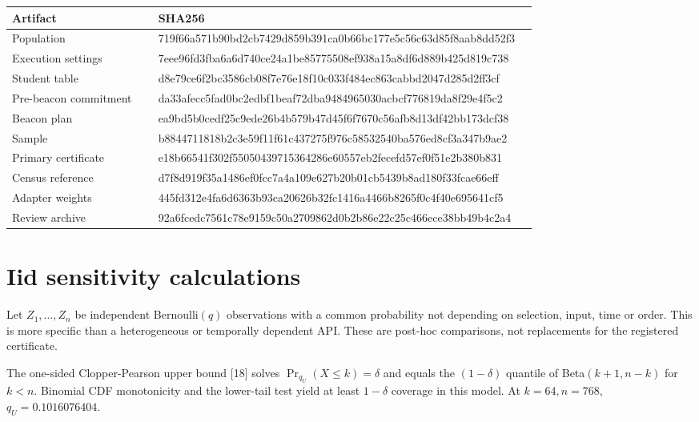 \documentclass[
  10pt,
]{article}
\let\oldsection\section
\renewcommand{\section}{\needspace{5\baselineskip}\oldsection}
\begin{document}
\begin{longtable}{@{}p{0.27\linewidth}p{0.70\linewidth}@{}}
\toprule
Artifact & SHA256 \\
\midrule
\endhead
Population & {\scriptsize\ttfamily 719f66a571b90bd2cb7429d859b391ca0b66bc177e5c56c63d85f8aab8dd52f3} \\
Execution settings & {\scriptsize\ttfamily 7eee96fd3fba6a6d740ce24a1be85775508ef938a15a8df6d889b425d819c738} \\
Student table & {\scriptsize\ttfamily d8e79ce6f2bc3586cb08f7e76e18f10c033f484ec863cabbd2047d285d2ff3cf} \\
Pre-beacon commitment & {\scriptsize\ttfamily da33afecc5fad0bc2edbf1beaf72dba9484965030acbcf776819da8f29e4f5c2} \\
Beacon plan & {\scriptsize\ttfamily ea9bd5b0cedf25c9ede26b4b579b47d45f6f7670c56afb8d13df42bb173dcf38} \\
Sample & {\scriptsize\ttfamily b8844711818b2c3e59f11f61c437275f976c58532540ba576ed8cf3a347b9ae2} \\
Primary certificate & {\scriptsize\ttfamily e18b66541f302f55050439715364286e60557eb2fecefd57ef0f51e2b380b831} \\
Census reference & {\scriptsize\ttfamily d7f8d919f35a1486ef0fcc7a4a109e627b20b01cb5439b8ad180f33fcae66eff} \\
Adapter weights & {\scriptsize\ttfamily 445fd312e4fa6d6363b93ca20626b32fc1416a4466b8265f0c4f40e695641cf5} \\
Review archive & {\scriptsize\ttfamily 92a6fcedc7561c78e9159c50a2709862d0b2b86e22c25c466ece38bb49b4c2a4} \\
\bottomrule
\end{longtable}

\hypertarget{iid-sensitivity-calculations}{%
\section{Iid sensitivity
calculations}\label{iid-sensitivity-calculations}}

Let \(Z_1,\ldots,Z_n\) be independent Bernoulli\((q)\) observations with
a common probability not depending on selection, input, time or order.
This is more specific than a heterogeneous or temporally dependent API.
These are post-hoc comparisons, not replacements for the registered
certificate.

The one-sided Clopper-Pearson upper bound {[}18{]} solves
\(\Pr_{q_U}(X\le k)=\delta\) and equals the \((1-\delta)\) quantile of
Beta\((k+1,n-k)\) for \(k<n\). Binomial CDF monotonicity and the
lower-tail test yield at least \(1-\delta\) coverage in this model. At
\(k=64,n=768\), \(q_U=0.1016076404\).
\end{document}
